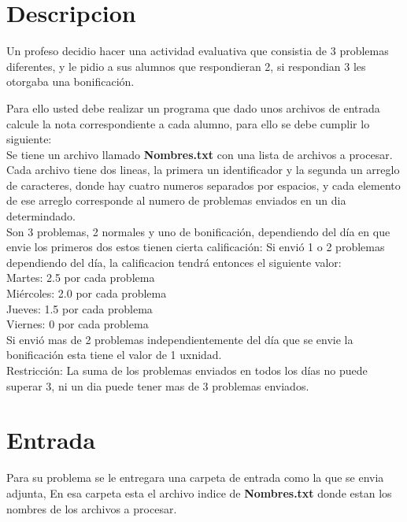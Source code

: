  \section{Descripcion}

Un profeso decidio hacer una actividad evaluativa que consistia de 3 problemas diferentes, y le pidio a sus alumnos que respondieran 2, si respondian 3 les otorgaba una bonificación.

Para ello usted debe realizar un programa que dado unos archivos de entrada calcule la nota correspondiente a cada alumno, para ello se debe cumplir lo siguiente:\\

Se tiene un archivo llamado \textbf{Nombres.txt} con una lista de archivos a procesar. Cada archivo tiene dos lineas, la primera un identificador y la segunda un arreglo de caracteres, donde hay cuatro numeros separados por espacios, y cada elemento de ese arreglo corresponde al numero de problemas enviados en un dia determindado.\\
        
Son 3 problemas, 2 normales y uno de bonificación, dependiendo del día en que envie los primeros dos estos tienen cierta calificación:
Si envió 1 o 2 problemas dependiendo del día, la calificacion tendrá entonces el siguiente valor:\\

Martes: 2.5 por cada problema \\
Miércoles: 2.0 por cada problema \\
Jueves: 1.5 por cada problema \\ 
Viernes: 0 por cada problema \\


Si envió mas de 2  problemas independientemente del día que se envie la bonificación esta tiene el valor de 1 uxnidad.\\

Restricción: La suma de los problemas enviados en todos los días no puede superar 3, ni un dia puede tener mas de 3 problemas enviados.


\newpage

\section{Entrada}

Para su problema se le entregara una carpeta de entrada como la que se envia adjunta, En esa carpeta esta el archivo indice de \textbf{Nombres.txt} donde estan los nombres de los archivos a procesar.

